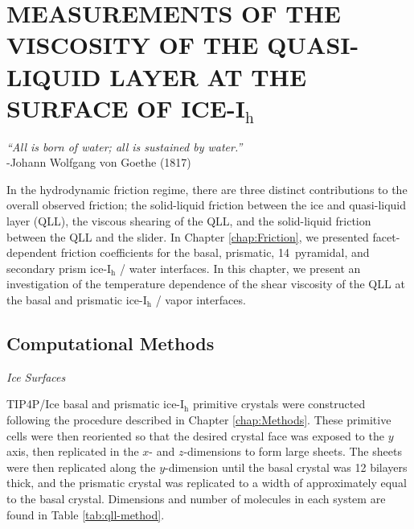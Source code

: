 \chapter{MEASUREMENTS OF THE VISCOSITY OF THE QUASI-LIQUID LAYER AT THE SURFACE OF ICE-I$_\mathrm{h}$}\label{chap:QLL}

\begin{flushright}
\textit{``All is born of water; all is sustained by water.''} \\
-Johann Wolfgang von Goethe (1817) \\
\end{flushright}

In the hydrodynamic friction regime, there are three distinct
contributions to the overall observed friction; the solid-liquid
friction between the ice and quasi-liquid layer (QLL), the viscous
shearing of the QLL, and the solid-liquid friction between the QLL and
the slider.\cite{Kietzig2009,Kietzig2010} In Chapter
\ref{chap:Friction}, we presented facet-dependent friction
coefficients for the basal, prismatic, 14\degree~pyramidal, and
secondary prism ice-I$_\mathrm{h}$ / water interfaces. In this
chapter, we present an investigation of the temperature dependence of
the shear viscosity of the QLL at the basal and prismatic
ice-I$_\mathrm{h}$ / vapor interfaces.



\section{Computational Methods}

\begin{flushleft}
\textit{Ice Surfaces}
\end{flushleft}

TIP4P/Ice basal and prismatic ice-I$_\mathrm{h}$ primitive crystals
were constructed following the procedure described in Chapter
\ref{chap:Methods}. These primitive cells were then reoriented so that
the desired crystal face was exposed to the $y$ axis, then replicated
in the $x$- and $z$-dimensions to form large sheets. The sheets were
then replicated along the $y$-dimension until the basal crystal was 12
bilayers thick, and the prismatic crystal was replicated to a width of
approximately equal to the basal crystal. Dimensions and number of
molecules in each system are found in Table \ref{tab:qll-method}.


